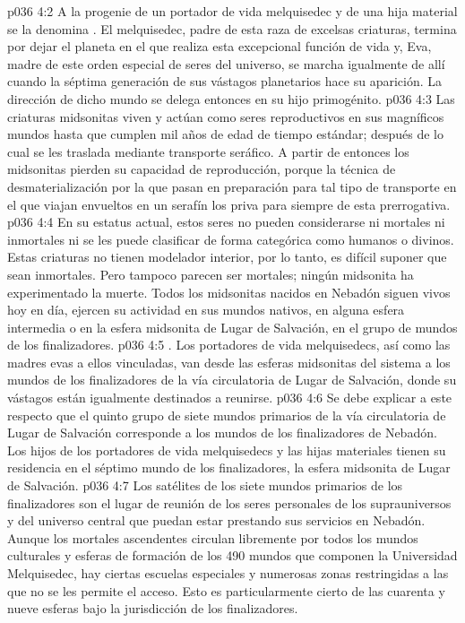 \vs p036 4:2 A la progenie de un portador de vida melquisedec y de una hija material se la denomina . El melquisedec, padre de esta raza de excelsas criaturas, termina por dejar el planeta en el que realiza esta excepcional función de vida y, Eva, madre de este orden especial de seres del universo, se marcha igualmente de allí cuando la séptima generación de sus vástagos planetarios hace su aparición. La dirección de dicho mundo se delega entonces en su hijo primogénito.
\vs p036 4:3 Las criaturas midsonitas viven y actúan como seres reproductivos en sus magníficos mundos hasta que cumplen mil años de edad de tiempo estándar; después de lo cual se les traslada mediante transporte seráfico. A partir de entonces los midsonitas pierden su capacidad de reproducción, porque la técnica de desmaterialización por la que pasan en preparación para tal tipo de transporte en el que viajan envueltos en un serafín los priva para siempre de esta prerrogativa.
\vs p036 4:4 En su estatus actual, estos seres no pueden considerarse ni mortales ni inmortales ni se les puede clasificar de forma categórica como humanos o divinos. Estas criaturas no tienen modelador interior, por lo tanto, es difícil suponer que sean inmortales. Pero tampoco parecen ser mortales; ningún midsonita ha experimentado la muerte. Todos los midsonitas nacidos en Nebadón siguen vivos hoy en día, ejercen su actividad en sus mundos nativos, en alguna esfera intermedia o en la esfera midsonita de Lugar de Salvación, en el grupo de mundos de los finalizadores.
\vs p036 4:5 \pc {}. Los portadores de vida melquisedecs, así como las madres evas a ellos vinculadas, van desde las esferas midsonitas del sistema a los mundos de los finalizadores de la vía circulatoria de Lugar de Salvación, donde su vástagos están igualmente destinados a reunirse.
\vs p036 4:6 Se debe explicar a este respecto que el quinto grupo de siete mundos primarios de la vía circulatoria de Lugar de Salvación corresponde a los mundos de los finalizadores de Nebadón. Los hijos de los portadores de vida melquisedecs y las hijas materiales tienen su residencia en el séptimo mundo de los finalizadores, la esfera midsonita de Lugar de Salvación.
\vs p036 4:7 Los satélites de los siete mundos primarios de los finalizadores son el lugar de reunión de los seres personales de los suprauniversos y del universo central que puedan estar prestando sus servicios en Nebadón. Aunque los mortales ascendentes circulan libremente por todos los mundos culturales y esferas de formación de los 490 mundos que componen la Universidad Melquisedec, hay ciertas escuelas especiales y numerosas zonas restringidas a las que no se les permite el acceso. Esto es particularmente cierto de las cuarenta y nueve esferas bajo la jurisdicción de los finalizadores.
